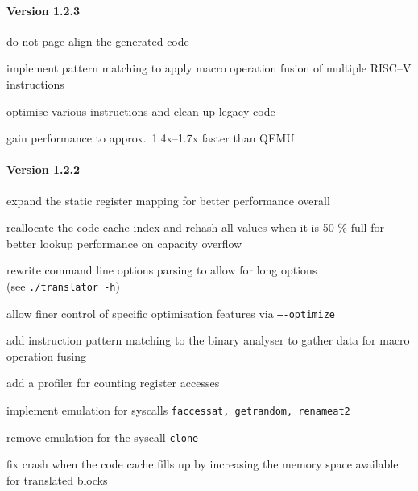 \paragraph{Version 1.2.3}
\begin{itemize*}
 	\item do not page-align the generated code
 	\item implement pattern matching to apply macro operation fusion of multiple RISC--V instructions
 	\item optimise various instructions and clean up legacy code
 	\item gain performance to approx.\ 1.4x--1.7x faster than QEMU
\end{itemize*}


\paragraph{Version 1.2.2}
\begin{itemize*}
 	\item expand the static register mapping for better performance overall
 	\item reallocate the code cache index and rehash all values when it is 50 \% full for better lookup performance on capacity overflow
 	\item rewrite command line options parsing to allow for long options\\(see \texttt{./translator -h})
 	\item allow finer control of specific optimisation features via \texttt{----optimize}
 	\item add instruction pattern matching to the binary analyser to gather data for macro operation fusing
 	\item add a profiler for counting register accesses
 	\item implement emulation for syscalls \texttt{faccessat, getrandom, renameat2}
 	\item remove emulation for the syscall \texttt{clone}
 	\item fix crash when the code cache fills up by increasing the memory space available for translated blocks
\end{itemize*}


